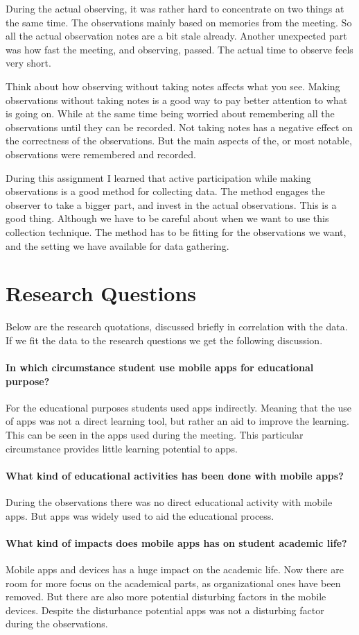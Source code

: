 \documentclass[12pt, a4paper]{article}
\begin{document}
During the actual observing, it was rather hard to concentrate on two things at
the same time. The observations mainly based on memories from the meeting. So
all the actual observation notes are a bit stale already. Another unexpected
part was how fast the meeting, and observing, passed. The actual time to
observe feels very short.  

Think about how observing without taking notes affects what you see.
Making observations without taking notes is a good way to pay better attention
to what is going on. While at the same time being worried about remembering all
the observations until they can be recorded. Not taking notes has a negative
effect on the correctness of the observations. But the main aspects of the, or most
notable, observations were remembered and recorded. 

During this assignment I learned that active participation while making
observations is a good method for  collecting data. The method engages the
observer to take a bigger part, and invest in the actual observations. This is
a good thing. Although we have to be careful about when we want to use this
collection technique. The method has to be fitting for the observations we
want, and the setting we have available for data gathering. 

\section{Research Questions}
Below are the research quotations, discussed briefly in correlation with the
data. If we fit the data to the research questions we get the following
discussion.  

\paragraph{In which circumstance student use mobile apps for educational
purpose?}
For the educational purposes students used apps indirectly. Meaning that the
use of apps was not a direct learning tool, but rather an aid to improve the
learning. This can be seen in the apps used during the meeting. This particular
circumstance provides little learning potential to apps.   

\paragraph{What kind of educational activities has been done with mobile apps?}
During the observations there was no direct educational activity with mobile
apps. But apps was widely used to aid the educational process.

\paragraph{What kind of impacts does mobile apps has on student academic life?}
Mobile apps and devices has a huge impact on the academic life. Now there are
room for more focus on the academical parts, as organizational ones have been
removed. But there are also more potential disturbing factors in the mobile
devices. Despite the disturbance potential apps was not a disturbing factor
during the observations. 
\end{document}
